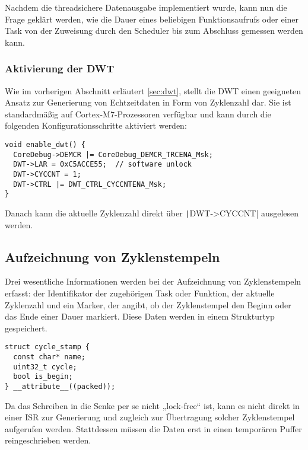 Nachdem die threadsichere Datenausgabe implementiert wurde, kann nun die Frage
geklärt werden, wie die Dauer eines beliebigen Funktionsaufrufs oder einer Task
von der Zuweisung durch den Scheduler bis zum Abschluss gemessen werden kann.

\subsubsection{Aktivierung der DWT}

Wie im vorherigen Abschnitt erläutert \ref{sec:dwt}, stellt die DWT einen
geeigneten Ansatz zur Generierung von Echtzeitdaten in Form von Zyklenzahl dar.
Sie ist standardmäßig auf Cortex-M7-Prozessoren verfügbar und kann durch die
folgenden Konfigurationsschritte aktiviert werden:

\begin{code}
\begin{verbatim}
void enable_dwt() {
  CoreDebug->DEMCR |= CoreDebug_DEMCR_TRCENA_Msk;
  DWT->LAR = 0xC5ACCE55;  // software unlock
  DWT->CYCCNT = 1;
  DWT->CTRL |= DWT_CTRL_CYCCNTENA_Msk;
}
\end{verbatim}
\end{code}

Danach kann die aktuelle Zyklenzahl direkt über \texttt|DWT->CYCCNT|
ausgelesen werden.

\subsection{Aufzeichnung von Zyklenstempeln}

Drei wesentliche Informationen werden bei der Aufzeichnung von Zyklenstempeln
erfasst: der Identifikator der zugehörigen Task oder Funktion, der aktuelle
Zyklenzahl und ein Marker, der angibt, ob der Zyklenstempel den Beginn oder das
Ende einer Dauer markiert. Diese Daten werden in einem Strukturtyp gespeichert.

\begin{code}
\begin{verbatim}
struct cycle_stamp {
  const char* name;
  uint32_t cycle;
  bool is_begin;
} __attribute__((packed));
\end{verbatim}
\end{code}

Da das Schreiben in die Senke per se nicht „lock-free“ ist, kann es nicht direkt
in einer ISR zur Generierung und zugleich zur Übertragung solcher Zyklenstempel
aufgerufen werden. Stattdessen müssen die Daten erst in einen temporären Puffer
reingeschrieben werden.

